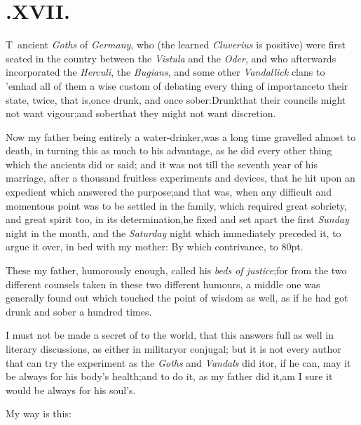 \documentclass{article}
\begin{document}
\smallskip

\section{.\enspace XVII.}

\lettrine{T}{\,} ancient \textit{Goths} of
\textit{Germany}, who (the learned \textit{Cluverius} is positive) were
first seated in the country between the \textit{Vistula} and the
\textit{Oder}, and who afterwards incorporated the \textit{Herculi}, the
\textit{Bugians}, and some other \textit{Vandallick} clans to
’em\tsk had all of them a wise custom of debating every
thing of importance\pb to their state, twice, that is,\tsk once
drunk, and once sober:\tsh Drunk\tsk that their councils
might not want vigour;\tsh and sober\tsk that they might
not want discretion.

Now my father being entirely a water-drinker,\tsk was a long
time gravelled almost to death, in turning this as much to his
advantage, as he did every other thing which the ancients did or
said; and it was not till the seventh year of his marriage, after a
thousand fruitless experiments and devices, that he hit upon an
expedient which answered the purpose;\tsh and that was,
when any difficult and momentous point was to be settled in the
family, which required great sobriety, and great spirit too, in its
determination,\tsh he fixed and set apart the first
\textit{Sunday} night in the month, and\pb 
the \textit{Saturday} night which immediately
preceded it, to argue it over, in bed\break
with my mother: By which contrivance,\break
{}
\stick{\astfill}
\stick{\astfill}
\stick{\astfill}
\hbox to 80pt{\astfill}.

These my father, humorously enough, called his \textit{beds of
justice};\tsh for from the two different counsels taken
in these two different humours, a middle one was generally found
out which touched the point of wisdom as well, as if he had got
drunk and sober a hundred times.

I must not be made a secret of to the world, that this answers
full as well in literary discussions, as either in military\pb or
conjugal; but it is not every author that can try the experiment as
the \textit{Goths} and \textit{Vandals} did it\tsh or, if he
can, may it be always for his body’s health;\break and to do it, as
my father did it,\tsk\break am I sure it would be always for his
soul’s.

My way is this:\tsh
\end{document}
